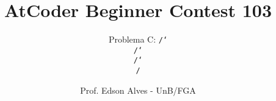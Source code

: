 \title{AtCoder Beginner Contest 103}
\subtitle{Problema C: {\tt /\char`\\/\char`\\/\char`\\/}}
\author{Prof. Edson Alves - UnB/FGA}
\date{}
